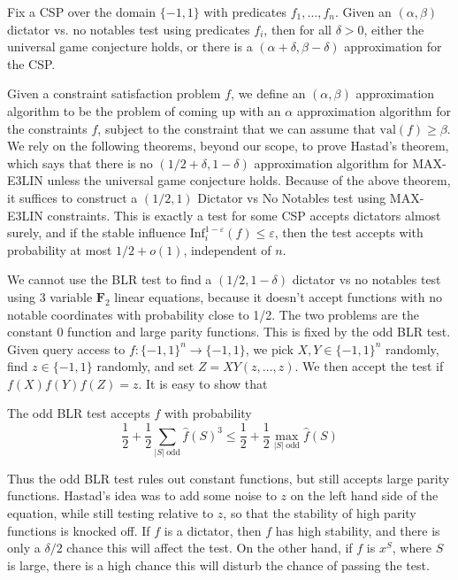 \begin{theorem}
    Fix a CSP over the domain $\{ -1, 1 \}$ with predicates $f_1, \dots, f_n$. Given an $(\alpha, \beta)$ dictator vs. no notables test using predicates $f_i$, then for all $\delta > 0$, either the universal game conjecture holds, or there is a $(\alpha + \delta, \beta - \delta)$ approximation for the CSP.
\end{theorem}

Given a constraint satisfaction problem $f$, we define an $(\alpha, \beta)$ approximation algorithm to be the problem of coming up with an $\alpha$ approximation algorithm for the constraints $f$, subject to the constraint that we can assume that $\text{val}(f) \geq \beta$. We rely on the following theorems, beyond our scope, to prove Hastad's theorem, which says that there is no $(1/2 + \delta, 1 - \delta)$ approximation algorithm for MAX-E3LIN unless the universal game conjecture holds. Because of the above theorem, it suffices to construct a $(1/2,1)$ Dictator vs No Notables test using MAX-E3LIN constraints. This is exactly a test for some CSP accepts dictators almost surely, and if the stable influence $\text{Inf}_i^{1-\varepsilon}(f) \leq \varepsilon$, then the test accepts with probability at most $1/2 + o(1)$, independent of $n$.

We cannot use the BLR test to find a $(1/2, 1 - \delta)$ dictator vs no notables test using 3 variable $\mathbf{F}_2$ linear equations, because  it doesn't accept functions with no notable coordinates with probability close to 1/2. The two problems are the constant 0 function and large parity functions. This is fixed by the odd BLR test. Given query access to $f: \{ -1, 1 \}^n \to \{ -1, 1 \}$, we pick $X,Y \in \{ -1, 1 \}^n$ randomly, find $z \in \{ -1, 1 \}$ randomly, and set $Z = XY(z,\dots,z)$. We then accept the test if $f(X) f(Y) f(Z) = z$. It is easy to show that

\begin{theorem}
    The odd BLR test accepts $f$ with probability
    \[ \frac{1}{2} + \frac{1}{2} \sum_{|S|\ \text{odd}} \widehat{f}(S)^3 \leq \frac{1}{2} + \frac{1}{2} \max_{|S|\ \text{odd}} \widehat{f}(S) \]
\end{theorem}
%
Thus the odd BLR test rules out constant functions, but still accepts large parity functions. Hastad's idea was to add some noise to $z$ on the left hand side of the equation, while still testing relative to $z$, so that the stability of high parity functions is knocked off. If $f$ is a dictator, then $f$ has high stability, and there is only a $\delta/2$ chance this will affect the test. On the other hand, if $f$ is $x^S$, where $S$ is large, there is a high chance this will disturb the chance of passing the test.

